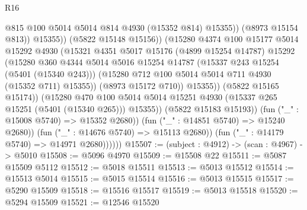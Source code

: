 \begin{lexlean}{R16}
\begin{coremodule}
                                        @815
                                        @100
                                        @5014
                                        @5014
                                        @814
                                        @4930
                                        (@15352 @814)
                                        @15355))
                                    (@8973 @15154 @813))
                                  @15355))
                              (@5822 @15148 @15156))
                            (@15280
                              @4374
                              @100
                              @15177
                              @5014
                              @15292
                              @4930
                              (@15321
                                @4351
                                @5017
                                @15176
                                (@4899 @15254 @14787)
                                @15292
                                (@15280
                                  @360
                                  @4344
                                  @5014
                                  @5016
                                  @15254
                                  @14787
                                  (@15337 @243 @15254 (@5401 (@15340 @243)))
                                  (@15280 @712 @100 @5014 @5014 @711 @4930 (@15352 @711) @15355))
                                (@8973 @15172 @710))
                              @15355))
                          (@5822 @15165 @15174))
                        (@15280
                          @470
                          @100
                          @5014
                          @5014
                          @15251
                          @4930
                          (@15337 @265 @15251 (@5401 (@15340 @265)))
                          @15355))
                      (@5822 @15183 @15193))
                    (fun ("_" : @15008 @5740) => @15352 @2680))
                  (fun ("_" : @14851 @5740) => @15240 @2680))
                (fun ("_" : @14676 @5740) => @15113 @2680))
              (fun ("_" : @14179 @5740) => @14971 @2680))))))
@15507 := (subject : @4912) -> (scan : @4967) -> @5010
@15508 := @5096 @4970
@15509 := @15508 @22
@15511 := @5087 @15509 @5112
@15512 := @5018 @15511
@15513 := @5013 @15512
@15514 := @15513 @5014
@15515 := @5015 @15514
@15516 := @5013 @15515
@15517 := @5290 @15509
@15518 := @15516 @15517
@15519 := @5013 @15518
@15520 := @5294 @15509
@15521 := @12546 @15520

\end{coremodule}
\end{lexlean}
